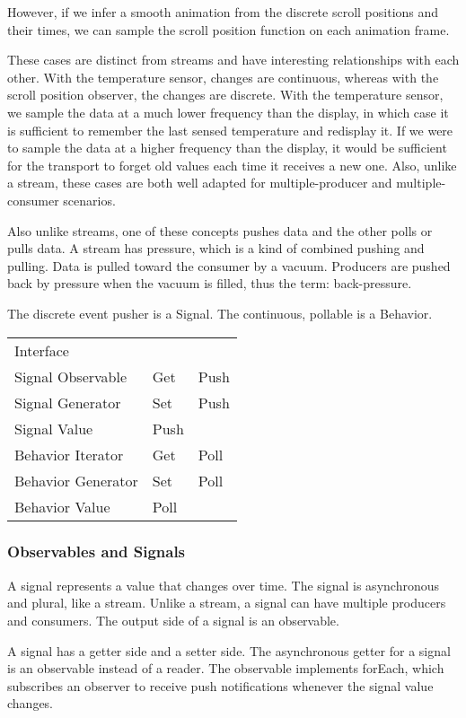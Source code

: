 However, if we infer a smooth animation from the discrete scroll positions and their times, we can sample the scroll position function on each animation frame.

These cases are distinct from streams and have interesting relationships with each other. With the temperature sensor, changes are continuous, whereas with the scroll position observer, the changes are discrete. With the temperature sensor, we sample the data at a much lower frequency than the display, in which case it is sufficient to remember the last sensed temperature and redisplay it. If we were to sample the data at a higher frequency than the display, it would be sufficient for the transport to forget old values each time it receives a new one. Also, unlike a stream, these cases are both well adapted for multiple-producer and multiple-consumer scenarios.

Also unlike streams, one of these concepts pushes data and the other polls or pulls data. A stream has pressure, which is a kind of combined pushing and pulling. Data is pulled toward the consumer by a vacuum. Producers are pushed back by pressure when the vacuum is filled, thus the term: back-pressure.

The discrete event pusher is a Signal. The continuous, pollable is a Behavior.

\begin{tabular}{|l|l|l|}
Interface& &  \\
Signal Observable	&Get	&Push\\
Signal Generator	&Set	&Push\\
Signal Value	&Push\\
Behavior Iterator	&Get	&Poll\\
Behavior Generator	&Set	&Poll\\
Behavior Value	&Poll &\\

\end{tabular}

\subsubsection{Observables and Signals}

A signal represents a value that changes over time. The signal is asynchronous and plural, like a stream. Unlike a stream, a signal can have multiple producers and consumers. The output side of a signal is an observable.

A signal has a getter side and a setter side. The asynchronous getter for a signal is an observable instead of a reader. The observable implements forEach, which subscribes an observer to receive push notifications whenever the signal value changes.

